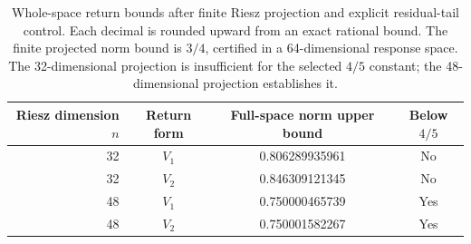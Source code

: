 \begin{table}[htbp]
\centering
\begin{tabular}{@{}rccc@{}}
\toprule
Riesz dimension $n$ & Return form & Full-space norm upper bound & Below $4/5$ \\
\midrule
32 & $V_1$ & 0.806289935961 & No \\
32 & $V_2$ & 0.846309121345 & No \\
48 & $V_1$ & 0.750000465739 & Yes \\
48 & $V_2$ & 0.750001582267 & Yes \\
\bottomrule
\end{tabular}
\caption{Whole-space return bounds after finite Riesz projection and
explicit residual-tail control. Each decimal is rounded upward from
an exact rational bound. The finite projected norm bound is $3/4$,
certified in a 64-dimensional response space. The 32-dimensional
projection is insufficient for the selected $4/5$ constant; the
48-dimensional projection establishes it.}
\label{tab:certificate}
\end{table}
